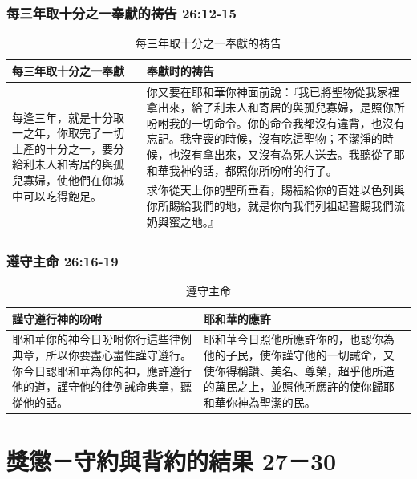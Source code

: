 \subsubsection{每三年取十分之一奉獻的祷告 26:12-15}
\begin{table}[H]
\begin{center}
\begin{tabular}{ p{}|p{}} \toprule
每三年取十分之一奉獻&奉獻时的祷告\\\hline
\multirow{3}{4cm}{每逢三年，就是十分取一之年，你取完了一切土產的十分之一，要分給利未人和寄居的與孤兒寡婦，使他們在你城中可以吃得飽足。} 
&你又要在耶和華你神面前說：『我已將聖物從我家裡拿出來，給了利未人和寄居的與孤兒寡婦，是照你所吩咐我的一切命令。你的命令我都沒有違背，也沒有忘記。我守喪的時候，沒有吃這聖物；不潔淨的時候，也沒有拿出來，又沒有為死人送去。我聽從了耶和華我神的話，都照你所吩咐的行了。\\\cline{2-2}
&求你從天上你的聖所垂看，賜福給你的百姓以色列與你所賜給我們的地，就是你向我們列祖起誓賜我們流奶與蜜之地。』\\\hline
\end{tabular}
\end{center}
\caption{每三年取十分之一奉獻的祷告}
\end{table}



\subsubsection{遵守主命 26:16-19 }
\begin{table}[H]
\begin{center}
\begin{tabular}{ p{8.2cm}|p{}} \toprule
謹守遵行神的吩咐&耶和華的應許\\\hline
耶和華你的神今日吩咐你行這些律例典章，所以你要盡心盡性謹守遵行。你今日認耶和華為你的神，應許遵行他的道，謹守他的律例誡命典章，聽從他的話。 
&耶和華今日照他所應許你的，也認你為他的子民，使你謹守他的一切誡命，又使你得稱讚、美名、尊榮，超乎他所造的萬民之上，並照他所應許的使你歸耶和華你神為聖潔的民。\\\hline
\end{tabular}
\end{center}
\caption{遵守主命}
\end{table}


\section{獎懲－守約與背約的結果 27－30}
